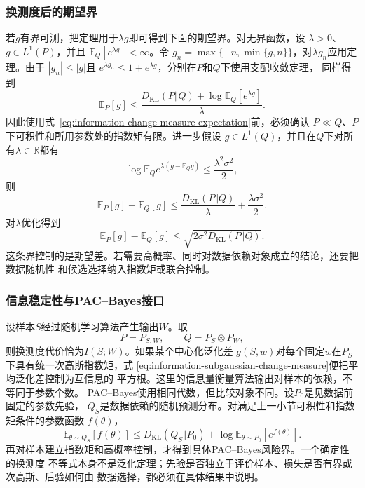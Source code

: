 \subsubsection{换测度后的期望界}
若\(g\)有界可测，把定理用于\(\lambda g\)即可得到下面的期望界。对无界函数，设
\(\lambda>0\)、\(g\in L^1(P)\)，并且
\(\mathbb{E}_Q[e^{\lambda g}]<\infty\)。令
\(g_n=\max\{-n,\min\{g,n\}\}\)，对\(\lambda g_n\)应用定理。由于
\(|g_n|\leq|g|\)且
\(e^{\lambda g_n}\leq1+e^{\lambda g}\)，分别在\(P\)和\(Q\)下使用支配收敛定理，
同样得到
\begin{equation}
  \mathbb{E}_P[g]
  \leq
  \frac{
    D_{\mathrm{KL}}(P\Vert Q)
    +\log\mathbb{E}_Q[e^{\lambda g}]
  }{\lambda}.
  \label{eq:information-change-measure-expectation}
\end{equation}
因此使用式~\eqref{eq:information-change-measure-expectation}前，必须确认
\(P\ll Q\)、\(P\)下可积性和所用参数处的指数矩有限。进一步假设
\(g\in L^1(Q)\)，并且在\(Q\)下对所有\(\lambda\in\mathbb{R}\)都有
\[
  \log\mathbb{E}_Q
  e^{\lambda(g-\mathbb{E}_Qg)}
  \leq
  \frac{\lambda^2\sigma^2}{2},
\]
则
\[
  \mathbb{E}_P[g]-\mathbb{E}_Q[g]
  \leq
  \frac{D_{\mathrm{KL}}(P\Vert Q)}{\lambda}
  +\frac{\lambda\sigma^2}{2}.
\]
对\(\lambda\)优化得到
\begin{equation}
  \mathbb{E}_P[g]-\mathbb{E}_Q[g]
  \leq
  \sqrt{2\sigma^2D_{\mathrm{KL}}(P\Vert Q)}.
  \label{eq:information-subgaussian-change-measure}
\end{equation}
这条界控制的是期望差。若需要高概率、同时对数据依赖对象成立的结论，还要把数据随机性
和候选选择纳入指数矩或联合控制。
\subsubsection{信息稳定性与PAC--Bayes接口}
设样本\(S\)经过随机学习算法产生输出\(W\)。取
\[
  P=P_{S,W},
  \qquad
  Q=P_S\otimes P_W,
\]
则换测度代价恰为\(I(S;W)\)。如果某个中心化泛化差
\(g(S,w)\)对每个固定\(w\)在\(P_S\)下具有统一次高斯指数矩，式
\eqref{eq:information-subgaussian-change-measure}便把平均泛化差控制为互信息的
平方根。这里的信息量衡量算法输出对样本的依赖，不等同于参数个数。
PAC--Bayes使用相同代数，但比较对象不同。设\(P_0\)是见数据前固定的参数先验，
\(Q_S\)是数据依赖的随机预测分布。对满足上一小节可积性和指数矩条件的参数函数
\(f(\theta)\)，
\[
  \mathbb{E}_{\theta\sim Q_S}[f(\theta)]
  \leq
  D_{\mathrm{KL}}(Q_S\Vert P_0)
  +
  \log\mathbb{E}_{\theta\sim P_0}[e^{f(\theta)}].
\]
再对样本建立指数矩和高概率控制，才得到具体PAC--Bayes风险界。一个确定性的换测度
不等式本身不是泛化定理；先验是否独立于评价样本、损失是否有界或次高斯、后验如何由
数据选择，都必须在具体结果中说明。

